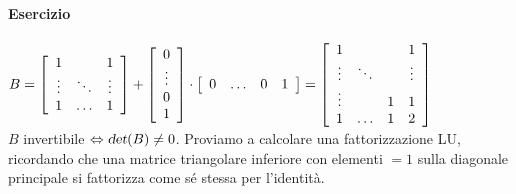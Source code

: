 \documentclass[10pt]{book}
\begin{document}
\paragraph{Esercizio} $B = \left[\begin{array}{c c c}
1 & & 1\\
\vdots & \ddots & \vdots\\
1 & \ldots & 1
\end{array} \right] + \left[\begin{array}{c}
0\\\vdots\\0\\1
\end{array}\right]\cdot\left[\begin{array}{c c c c}
0&\ldots&0&1
\end{array}\right] =  \left[\begin{array}{c c c c}
1 & & & 1\\
\vdots & \ddots & & \vdots\\
\vdots & & 1 & 1\\
1 & \ldots & 1 & 2
\end{array} \right]$\\
$B$ invertibile $\Leftrightarrow \textsl{det}(B) \neq 0$. Proviamo a calcolare una fattorizzazione LU, ricordando che una matrice triangolare inferiore con elementi $=1$ sulla diagonale principale si fattorizza come sé stessa per l'identità.\\
\end{document}
